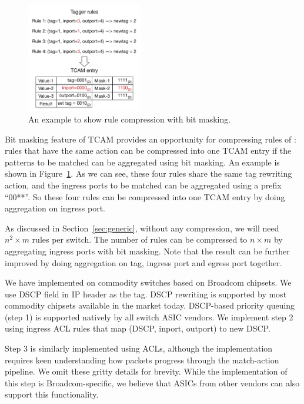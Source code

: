 \begin{figure}
	\centering
	\includegraphics[width=0.45\textwidth] {figs/compression_with_bitmasking}
	\caption{An example to show rule compression with bit masking.}\label{fig:compression}
	
\end{figure}


Bit masking feature of TCAM provides an opportunity for compressing rules of \sysname{}: rules that have the same action can be compressed into one TCAM entry if the patterns to be matched can be aggregated using bit masking. An example is shown in Figure~\ref{fig:compression}. As we can see, these four rules share the same tag rewriting action, and the ingress ports to be matched can be aggregated using a prefix ``00**''. So these four rules can be compressed into one TCAM entry by doing aggregation on ingress port.

As discussed in Section~\ref{sec:generic}, without any compression, we will need $n^2\times m$ rules per switch. The number of rules can be compressed to $n\times m$ by aggregating ingress ports with bit masking. Note that the result can be further improved by doing aggregation on tag, ingress port and egress port together. 


We have implemented \sysname{} on commodity switches based on Broadcom chipsets.
We use DSCP field in IP header as the tag. DSCP rewriting is supported by most
commodity chipsets available in the market today. DSCP-based priority queuing
(step 1) is supported natively by all switch ASIC vendors. We implement step 2
using ingress ACL rules that map (DSCP, inport, outport) to new DSCP. 

Step 3 is similarly implemented using ACLs, although the implementation requires
keen understanding how packets progress through the match-action pipeline. We
omit these gritty details for brevity. While the implementation of this step is
Broadcom-specific, we believe that ASICs from other vendors can also support
this functionality.

